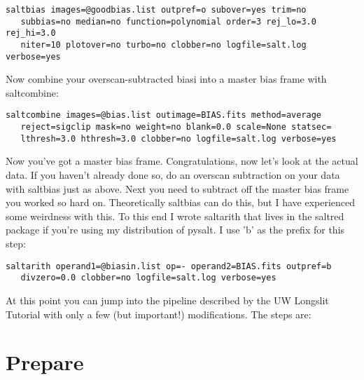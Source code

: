 \documentclass[letter,11pt,oneside]{article}
\begin{document}
\begingroup \fontsize{10pt}{10pt}
\selectfont
\begin{verbatim} 
saltbias images=@goodbias.list outpref=o subover=yes trim=no
   subbias=no median=no function=polynomial order=3 rej_lo=3.0 rej_hi=3.0
   niter=10 plotover=no turbo=no clobber=no logfile=salt.log verbose=yes
\end{verbatim}
\endgroup

Now combine your overscan-subtracted biasi into a master bias frame
with saltcombine:

\begingroup \fontsize{10pt}{10pt}
\selectfont
\begin{verbatim} 
saltcombine images=@bias.list outimage=BIAS.fits method=average
   reject=sigclip mask=no weight=no blank=0.0 scale=None statsec=
   lthresh=3.0 hthresh=3.0 clobber=no logfile=salt.log verbose=yes
\end{verbatim}
\endgroup

Now you've got a master bias frame. Congratulations, now let's look at
the actual data. If you haven't already done so, do an overscan
subtraction on your data with saltbias just as above. Next you need to
subtract off the master bias frame you worked so hard
on. Theoretically saltbias can do this, but I have experienced some
weirdness with this. To this end I wrote saltarith that lives in the
saltred package if you're using my distribution of pysalt. I use 'b'
as the prefix for this step:

\begingroup \fontsize{10pt}{10pt}
\selectfont
\begin{verbatim} 
saltarith operand1=@biasin.list op=- operand2=BIAS.fits outpref=b
   divzero=0.0 clobber=no logfile=salt.log verbose=yes
\end{verbatim}
\endgroup

At this point you can jump into the pipeline described by the UW
Longslit Tutorial with only a few (but important!) modifications. The
steps are:

\section{Prepare}
\end{document}
